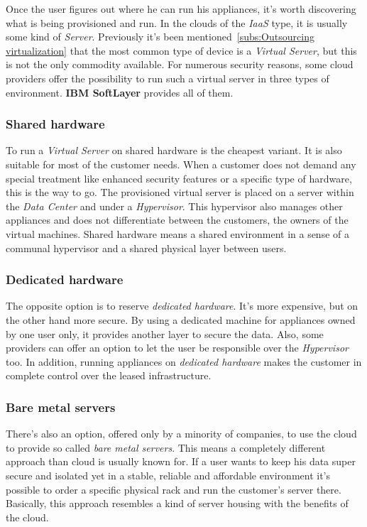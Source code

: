 Once the user figures out where he can run his appliances, it's worth discovering what is being provisioned and run. In the clouds of the \emph{IaaS} type, it is usually some kind of \emph{Server}. Previously it's been mentioned~\ref{subs:Outsourcing virtualization} that the most common type of device is a \emph{Virtual Server}, but this is not the only commodity available. For numerous security reasons, some cloud providers offer the possibility to run such a virtual server in three types of environment. \textbf{IBM SoftLayer} provides all of them.

\subsubsection{Shared hardware}
\label{subs:Shared hardware}

To run a \emph{Virtual Server} on shared hardware is the cheapest variant. It is also suitable for most of the customer needs. When a customer does not demand any special treatment like enhanced security features or a specific type of hardware, this is the way to go. The provisioned virtual server is placed on a server within the \emph{Data Center} and under a \emph{Hypervisor}. This hypervisor also manages other appliances and does not differentiate between the customers, the owners of the virtual machines. Shared hardware means a shared environment in a sense of a communal hypervisor and a shared physical layer between users.

\subsubsection{Dedicated hardware}
\label{subs:Dedicated hardware}

The opposite option is to reserve \emph{dedicated hardware}. It's more expensive, but on the other hand more secure. By using a dedicated machine for appliances owned by one user only, it provides another layer to secure the data. Also, some providers can offer an option to let the user be responsible over the \emph{Hypervisor} too. In addition, running appliances on \emph{dedicated hardware} makes the customer in complete control over the leased infrastructure.

\subsubsection{Bare metal servers}
\label{subs:Bare metal servers}

There's also an option, offered only by a minority of companies, to use the cloud to provide so called \emph{bare metal servers}. This means a completely different approach than cloud is usually known for. If a user wants to keep his data super secure and isolated yet in a stable, reliable and affordable environment it's possible to order a specific physical rack and run the customer's server there. Basically, this approach resembles a kind of server housing with the benefits of the cloud.

